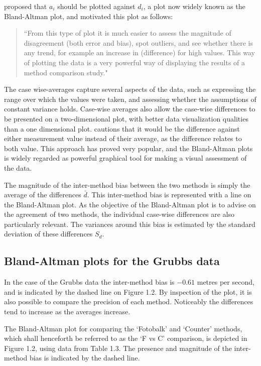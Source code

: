 \documentclass[Main.tex]{subfiles}
\begin{document}
	\citet{BA83} proposed that $a_i$ should be plotted against $d_i$, a plot now widely known as the Bland-Altman plot, and motivated this plot as follows:
	\begin{quote}
		``From this type of plot it is much easier to assess the magnitude
		of disagreement (both error and bias), spot outliers, and see
		whether there is any trend, for example an increase in (difference) for high values. This way of plotting the data is a very powerful way of displaying the results of a method comparison study."
	\end{quote}
	
	The case wise-averages capture several aspects of the data, such as expressing the range over which the values were taken, and assessing whether the assumptions of constant variance holds.
	Case-wise averages also allow the case-wise differences to be presented on a two-dimensional plot, with better data visualization qualities than a one dimensional plot. \citet{BA86}
	cautions that it would be the difference against either measurement value instead of their average, as the difference relates to both value. This approach has proved very popular, and the Bland-Altman plots is widely regarded as powerful graphical tool for making a visual assessment of the data.
	
	The magnitude of the inter-method bias between the two methods is simply the average of the differences $\bar{d}$. This inter-method bias is represented with a line on the Bland-Altman plot. As the objective of the Bland-Altman plot is to advise on the agreement of two methods, the individual case-wise differences are also particularly relevant. The variances around this bias is estimated by the standard deviation of these differences $S_{d}$.

	\subsection{Bland-Altman plots for the Grubbs data}
	
	In the case of the Grubbs data the inter-method bias is $-0.61$ metres per second, and is indicated by the dashed line on Figure 1.2. By inspection of the plot, it is also possible to compare the precision of each method. Noticeably the differences tend to increase as the averages increase.
	
	
	The Bland-Altman plot for comparing the `Fotobalk' and `Counter'
	methods, which shall henceforth be referred to as the `F vs C'
	comparison,  is depicted in Figure 1.2, using data from Table 1.3.
	The presence and magnitude of the inter-method bias is indicated
	by the dashed line.
	\newpage
	
\end{document}
